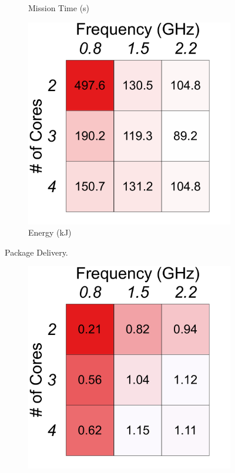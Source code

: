 {\begin{figure}[t!]
\begin{subfigure}[t!]{.3\columnwidth}
    \caption{Mission Time (s)}
    \label{fig:benchmarks:OPA:pd:time}
    \end{subfigure}
    \begin{subfigure}[t!]{.3\columnwidth}
    \centering
    \includegraphics[width=\columnwidth] {figs/pd_energy_operating_point}
    \caption{Energy (kJ)}
     \label{fig:benchmarks:OPA:pd:energy}
    \end{subfigure}
    \caption{Package Delivery.}
    \label{fig:benchmarks:OPA:pd}
    \end{figure}%
    \begin{figure}[t!]
    \centering
    \begin{subfigure}[t!]{.3\columnwidth}
    \centering
    \includegraphics[width=\columnwidth]{figs/mapping_velocity_operating_point}

\end{subfigure}
\end{figure}}
